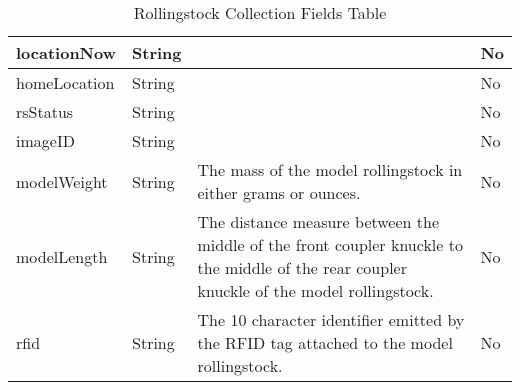\begin{table}[H]
\begin{tabular}{|L{3cm}|L{1.7cm}|L{8.8cm}|L{1.3cm}|}
	locationNow & String &  & No \\ \hline
	homeLocation & String &  & No \\ \hline
	rsStatus & String &  & No \\ \hline
	imageID & String &  & No \\ \hline
	modelWeight & String & The mass of the model rollingstock in either grams or ounces. & No \\ \hline
	modelLength & String & The distance measure between the middle of the front coupler knuckle to the middle of the rear coupler knuckle of the model rollingstock. & No \\ \hline
	rfid & String & The 10 character identifier emitted by the RFID tag attached to the model rollingstock. & No \\ \hline
    \end{tabular}
    \caption{\label{rollingstock-table}Rollingstock Collection Fields Table}
    \end{table}
